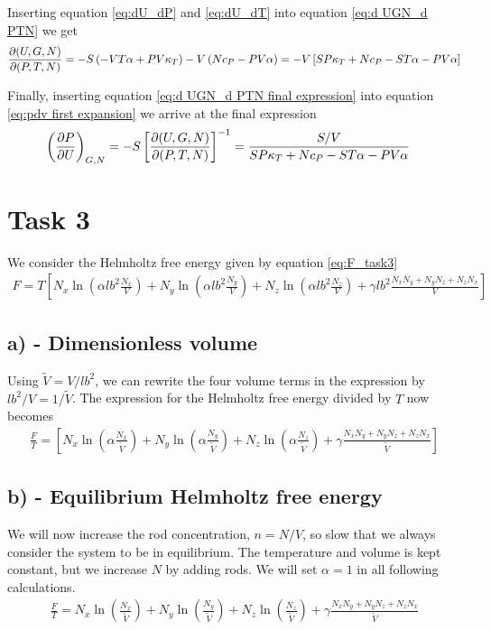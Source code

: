 \documentclass[reprint,english,notitlepage,aps,nobalancelastpage,nofootinbib]{revtex4-1}
\newcommand{\closed}[1]{\left(#1\right)}
\newcommand{\bracket}[1]{\left[#1\right]}
\newcommand{\kt}{\kappa_T}
\renewcommand{\cp}{c_P}
\renewcommand{\a}{\alpha}
\newcommand{\tmdv}[4]{\closed{\pdv{#1}{#2}}_{#3,#4}}
\newcommand{\jacobian}[2]{\pdv{(#1)}{(#2)}}
\newcommand{\nx}{N_x}
\newcommand{\ny}{N_y}
\newcommand{\nz}{N_z}
\begin{document}
Inserting equation \eqref{eq:dU_dP} and \eqref{eq:dU_dT} into equation \eqref{eq:d UGN_d PTN} we get 
\begin{align}
	\jacobian{U,G,N}{P,T,N} = -S \closed{-VT \a + PV\kt} - V \closed{N\cp - PV\a} = -V\bracket{SP\kt + N\cp -ST\a - PV\a} \label{eq:d UGN_d PTN final expression}
\end{align}

Finally, inserting equation \eqref{eq:d UGN_d PTN final expression} into equation \eqref{eq:pdv first expansion} we arrive at the final expression 
\begin{align}
	\tmdv{P}{U}{G}{N} &= -S \bracket{\jacobian{U,G,N}{P,T,N}}^{-1} = \frac{S/V}{SP\kt + N\cp -ST\a - PV\a}
\end{align}

\clearpage
\section*{\large Task 3}
We consider the Helmholtz free energy given by equation \eqref{eq:F_task3}
\begin{align} \label{eq:F_task3}
	F = T \bracket{N_x \ln\closed{\a l b^2 \frac{N_x}{{V}}} + N_y \ln\closed{\a l b^2 \frac{N_y}{{V}}} + N_z \ln\closed{\a l b^2 \frac{N_z}{{V}}} + \gamma l b^2 \frac{\nx\ny+\ny\nz+\nz\nx}{{V}} }
\end{align}

\subsection*{a) - Dimensionless volume}
Using $\tilde{V}=V/lb^2$, we can rewrite the four volume terms in the expression by $lb^2/V=1/\tilde{V}$. The expression for the Helmholtz free energy divided by $T$ now becomes 
\begin{align*} 
	\frac{F}{T} = \bracket{N_x \ln\closed{\a  \frac{N_x}{\tilde{V}}} + N_y \ln\closed{\a  \frac{N_y}{\tilde{V}}} + N_z \ln\closed{\a  \frac{N_z}{\tilde{V}}} + \gamma \frac{\nx\ny+\ny\nz+\nz\nx}{\tilde{V}} }
\end{align*}

\subsection*{b) - Equilibrium Helmholtz free energy}
We will now increase the rod concentration, $n=N/V$, so slow that we always consider the system to be in equilibrium. The temperature and volume is kept constant, but we increase $N$ by adding rods. We will set $\alpha=1$ in all following calculations.  
\begin{align} \label{eq:F_dimless}
	\frac{F}{T} = N_x \ln\closed{\frac{N_x}{\tilde{V}}} + N_y \ln\closed{\frac{N_y}{\tilde{V}}} + N_z \ln\closed{\frac{N_z}{\tilde{V}}} + \gamma \frac{\nx\ny+\ny\nz+\nz\nx}{\tilde{V}}
\end{align}
\end{document}
